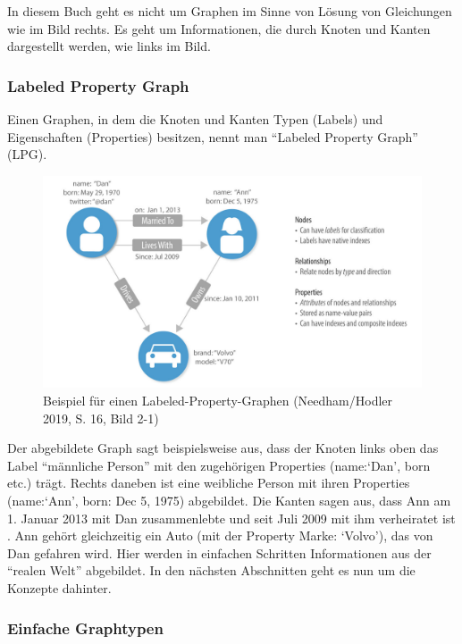 In diesem Buch geht es nicht um Graphen im Sinne von Lösung von
Gleichungen wie im Bild rechts. Es geht um Informationen, die durch
Knoten und Kanten dargestellt werden, wie links im Bild.

\hypertarget{labeled-property-graph}{%
\subsubsection{Labeled Property Graph}\label{labeled-property-graph}}

Einen Graphen, in dem die Knoten und Kanten Typen (Labels) und
Eigenschaften (Properties) besitzen, nennt man ``Labeled Property
Graph'' (LPG).

\begin{figure}
\centering
\includegraphics{Bilder/Graph-Algorithms/16-2-1-LabeledPropertyGraph.png}
\caption{Beispiel für einen Labeled-Property-Graphen (Needham/Hodler
2019, S. 16, Bild 2-1)}
\end{figure}

Der abgebildete Graph sagt beispielsweise aus, dass der Knoten links
oben das Label ``männliche Person'' mit den zugehörigen Properties
(name:`Dan', born etc.) trägt. Rechts daneben ist eine weibliche Person
mit ihren Properties (name:`Ann', born: Dec 5, 1975) abgebildet. Die
Kanten sagen aus, dass Ann am 1. Januar 2013 mit Dan zusammenlebte und
seit Juli 2009 mit ihm verheiratet ist . Ann gehört gleichzeitig ein
Auto (mit der Property Marke: `Volvo'), das von Dan gefahren wird. Hier
werden in einfachen Schritten Informationen aus der ``realen Welt''
abgebildet. In den nächsten Abschnitten geht es nun um die Konzepte
dahinter.

\hypertarget{einfache-graphtypen}{%
\subsubsection{Einfache Graphtypen}\label{einfache-graphtypen}}


